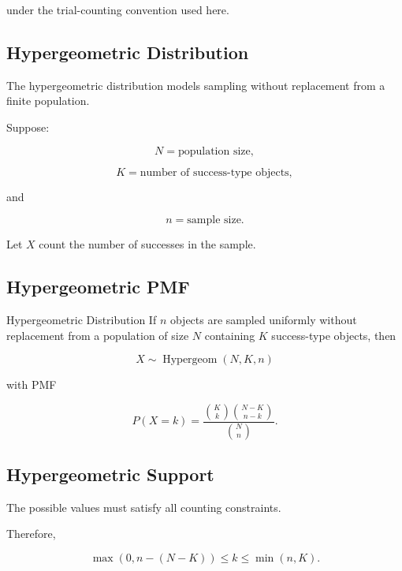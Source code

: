 under the trial-counting convention used here.

\subsection{Hypergeometric Distribution}
\label{subsec:hypergeometric-distribution}

The hypergeometric distribution models sampling without replacement
from a finite population.

Suppose:

\[
N
=
\text{population size},
\]

\[
K
=
\text{number of success-type objects},
\]

and

\[
n
=
\text{sample size}.
\]

Let \(X\) count the number of successes in the sample.

\subsection{Hypergeometric PMF}
\label{subsec:hypergeometric-pmf}

\begin{definitionbox}{Hypergeometric Distribution}
If \(n\) objects are sampled uniformly without replacement from a
population of size \(N\) containing \(K\) success-type objects, then

\[
\boxed{
X\sim\operatorname{Hypergeom}(N,K,n)
}
\]

with PMF

\[
\boxed{
P(X=k)
=
\frac{
\binom Kk
\binom{N-K}{n-k}
}{
\binom Nn
}.
}
\]
\end{definitionbox}

\subsection{Hypergeometric Support}
\label{subsec:hypergeometric-support}

The possible values must satisfy all counting constraints.

Therefore,

\[
\boxed{
\max(0,n-(N-K))
\leq
k
\leq
\min(n,K).
}
\]

